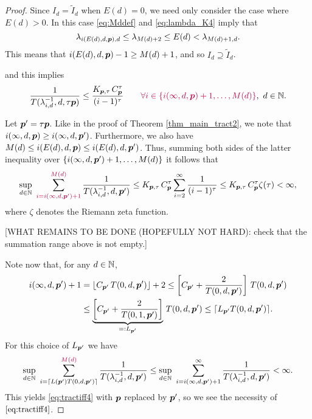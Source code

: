 \documentclass[11pt,a4paper]{article}
\newcommand{\tI}{\widetilde{I}}
\newcommand{\peter}[1]{\begingroup\color{purple}#1\endgroup}
\begin{document}
\begin{proof}
Since $I_d = \tI_d$ when $E(d) =0$, we need only consider the case where $E(d) > 0$.  In this case \eqref{eq:Mddef} and \eqref{eq:lambda_K4} imply that
\[
\lambda_{i(E(d),d,\boldsymbol{p}),d} \le \lambda_{M(d)+2} \le E(d) < \lambda_{M(d)+1,d}.
\]
This means that $i(E(d),d,\boldsymbol{p})-1 \ge M(d)+1$, and so $I_d \supseteq \tI_d$.



 and this implies
 \[
	 \frac{1}{T (\lambda_{i,d}^{-1},d,\tau \vp)} \le
	\frac{K_{\vp,\tau}\, C_{\vp}^\tau}{(i-1)^\tau}\qquad  \peter{\forall i\in 
 \{i(\infty,d,\vp)+1,\ldots, M(d)\}},  \ d \in \naturals.
\]

Let $\boldsymbol{p}' = \tau \boldsymbol{p}$. \peter{Like in the proof of Theorem \ref{thm_main_tract2}, we note that $i(\infty,d,\boldsymbol{p}) 
\ge i(\infty,d,\boldsymbol{p}')$. Furthermore, we also have 
$M(d)\le i(E(d),d,\boldsymbol{p})\le i(E(d),d,\boldsymbol{p}')$. Thus,}
summing both sides of the latter inequality over \peter{$\{i(\infty,d,\boldsymbol{p}')+1,\ldots, M(d)\} $} it follows that
\begin{equation*}
	\sup_{d\in\naturals} \, \, \sum_{\peter{i=i(\infty,d,\vp')+1}}^{\peter{M(d)}} \frac{1}{T (\lambda_{i,d}^{-1},d,\vp')}
	 \le  K_{\vp,\tau}\, C_{\vp}^\tau
	\sum_{i=2}^{\infty} \frac{1}{(i-1)^\tau} \\
	 \le  K_{\vp,\tau}\, C_{\vp}^\tau
	\zeta (\tau)  < \infty,
\end{equation*}
where $\zeta$ denotes the Riemann zeta function.

\peter{[WHAT REMAINS TO BE DONE (HOPEFULLY NOT HARD): check that the summation range above is not empty.]}



Note now that, for any $d\in\mathbb{N}$,
\begin{align*}
 i(\infty,d,\boldsymbol{p}') +1  & = \lfloor C_{\boldsymbol{p}'}\, T(0,d,\boldsymbol{p}')\rfloor +2 \le  \left[C_{\boldsymbol{p}'} + \frac{2}{T(0,d,\boldsymbol{p}')}   \right]\, T(0,d,\boldsymbol{p}')\\
 & \le  \underbrace{\left[C_{\boldsymbol{p}'} + \frac{2}{T(0,1,\boldsymbol{p}')}   \right]}_{=:L_{\boldsymbol{p}'}}\, T(0,d,\boldsymbol{p}')
 \le \lceil L_{\boldsymbol{p}'} T(0,d,\boldsymbol{p}')\rceil .
\end{align*}
For this choice of $L_{\boldsymbol{p}'}$ we have
\[
\sup_{d\in\naturals}\,\, \sum_{i=\lceil L(\vp') T(0,d,\vp')\rceil}^{\peter{M(d)}} \frac{1}{T(\lambda_{i,d}^{-1},d, \vp')}
\le
\sup_{d\in\naturals} \, \, \sum_{i=i (\infty,d,\vp')+1}^\infty \frac{1}{T (\lambda_{i,d}^{-1},d,\vp')} <
\infty.
\]
This yields \eqref{eq:tractiff4} with $\boldsymbol{p}$ replaced by $\boldsymbol{p}'$, so we see the necessity of $\eqref{eq:tractiff4}$.

\bigskip


\end{proof}
\end{document}
